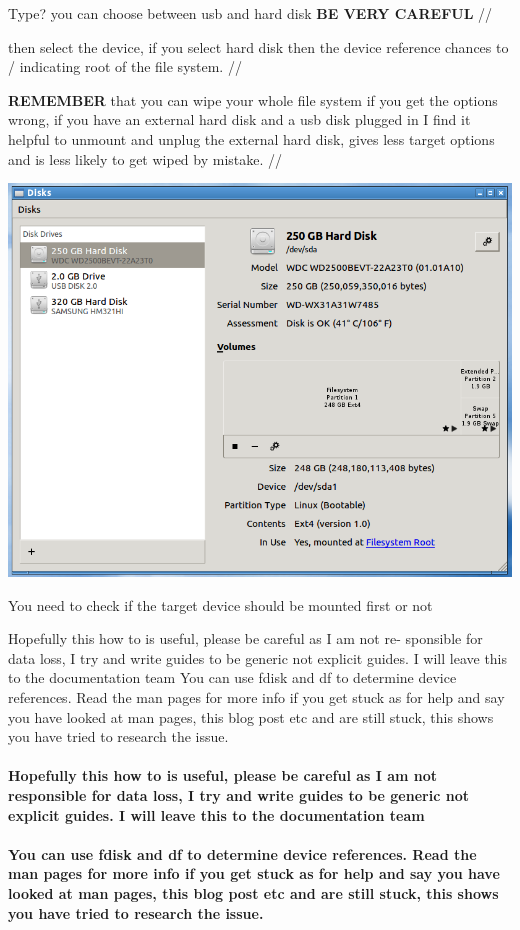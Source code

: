 \documentclass[12pt,a4paper]{book}
\begin{document}
Type? you can choose between usb and hard disk \textbf{BE VERY CAREFUL} //

then select the device, if you select hard disk then the device reference chances to / indicating root of the file system. //

\textbf{REMEMBER} that you can wipe your whole file system if you get the options wrong,  if you have an external hard disk and a usb disk plugged in I find it helpful to unmount and unplug the external hard disk,  gives less target options and is less likely to get wiped by mistake. //

 
\begin{center}
\includegraphics[width=0.7\linewidth]{unetbootin4}
\end{center}
You need to check if the target device should be mounted first or not

Hopefully this how to is useful, please be careful as I am not re-
sponsible for data loss, I try and write guides to be generic not
explicit guides. I will leave this to the documentation team
You can use fdisk and df to determine device references. Read the
man pages for more info if you get stuck as for help and say you
have looked at man pages, this blog post etc and are still stuck,
this shows you have tried to research the issue.

\paragraph{Hopefully this how to is useful,  please be careful as I am not responsible for data loss,  I try and write guides to be generic not explicit guides.  I will leave this to the documentation team}

\paragraph{You can use fdisk and df to determine device references. Read the man pages for more info if you get stuck as for help and say you have looked at man pages,  this blog post etc and are still stuck,  this shows you have tried to research the issue.}
\end{document}
